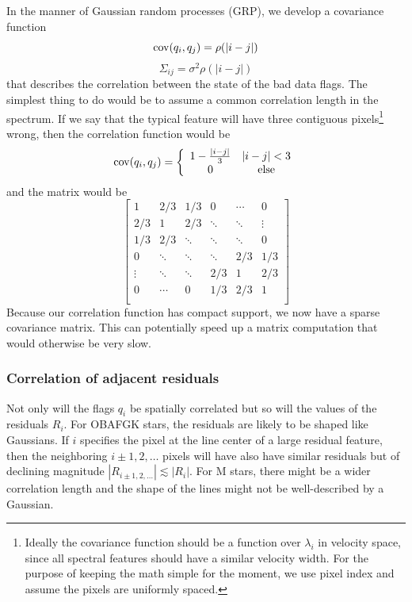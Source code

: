 \documentclass[preprint]{aastex} %
\begin{document}
In the manner of Gaussian random processes (GRP), we develop a covariance function
\begin{equation}
  {\rm cov}(q_i, q_j) = \rho(| i - j|)
\end{equation}
\begin{equation}
  \Sigma_{ij} = \sigma^2 \rho(|i - j|)
\end{equation}
that describes the correlation between the state of the bad data flags. The simplest thing to do would be to assume a common correlation length in the spectrum. If we say that the typical feature will have three contiguous pixels\footnote{Ideally the covariance function should be a function over $\lambda_i$ in velocity space, since all spectral features should have a similar velocity width. For the purpose of keeping the math simple for the moment, we use pixel index and assume the pixels are uniformly spaced.} wrong, then the correlation function would be
\begin{equation}
  {\rm cov}(q_i, q_j) = \left \{ \begin{array}{cc}
    1 - \frac{|i - j|}{3} & |i - j| < 3 \\
    0                                    & \textrm{else}
\end{array}
\right .
\end{equation}
and the matrix would be
\begin{equation}
  \begin{bmatrix}
    1 & 2/3 & 1/3 & 0 & \cdots & 0\\
    2/3 & 1 & 2/3 & \ddots & \ddots & \vdots\\
    1/3 & 2/3 & \ddots & \ddots & \ddots & 0\\
    0  & \ddots & \ddots & \ddots & 2/3 & 1/3\\
    \vdots & \ddots & \ddots & 2/3 & 1 & 2/3\\
    0      & \cdots & 0 & 1/3 & 2/3 & 1\\
  \end{bmatrix}
\end{equation}
Because our correlation function has compact support, we now have a sparse covariance matrix. This can potentially speed up a matrix computation that would otherwise be very slow. 

\subsubsection{Correlation of adjacent residuals}
Not only will the flags $q_i$ be spatially correlated but so will the values of the residuals $R_i$. For OBAFGK stars, the residuals are likely to be shaped like Gaussians. If $i$ specifies the pixel at the line center of a large residual feature, then the neighboring $i \pm 1,2,\ldots$ pixels will have also have similar residuals but of declining magnitude $|R_{i\pm 1, 2, \ldots} | \lesssim |R_i|$.  For M stars, there might be a wider correlation length and the shape of the lines might not be well-described by a Gaussian. 
\end{document}
